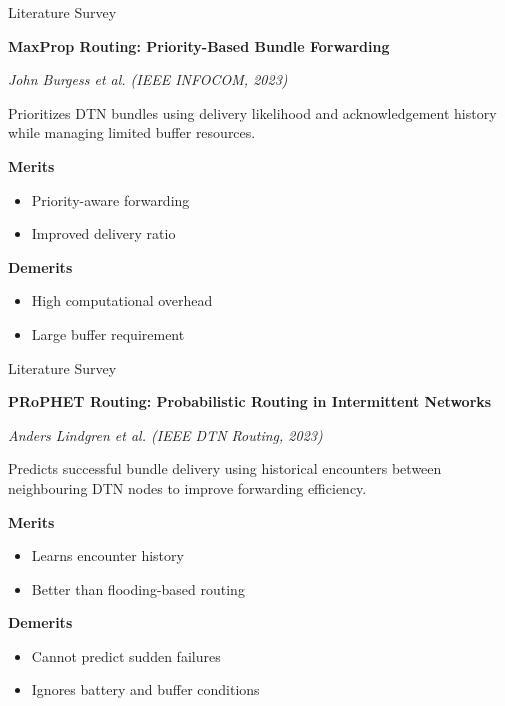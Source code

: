 \documentclass[11pt,aspectratio=43]{beamer}
\begin{document}
\begin{frame}{Literature Survey}

\textbf{MaxProp Routing: Priority-Based Bundle Forwarding}

\textit{John Burgess et al. (IEEE INFOCOM, 2023)}

\vspace{0.2cm}

Prioritizes DTN bundles using delivery likelihood and acknowledgement history while managing limited buffer resources.

\vspace{0.2cm}

\textbf{Merits}
\begin{itemize}
    \item Priority-aware forwarding
    \item Improved delivery ratio
\end{itemize}

\textbf{Demerits}
\begin{itemize}
    \item High computational overhead
    \item Large buffer requirement
\end{itemize}

\end{frame}
\begin{frame}{Literature Survey}

\textbf{PRoPHET Routing: Probabilistic Routing in Intermittent Networks}

\textit{Anders Lindgren et al. (IEEE DTN Routing, 2023)}

\vspace{0.2cm}

Predicts successful bundle delivery using historical encounters between neighbouring DTN nodes to improve forwarding efficiency.

\vspace{0.2cm}

\textbf{Merits}
\begin{itemize}
    \item Learns encounter history
    \item Better than flooding-based routing
\end{itemize}

\textbf{Demerits}
\begin{itemize}
    \item Cannot predict sudden failures
    \item Ignores battery and buffer conditions
\end{itemize}

\end{frame}
\end{document}
